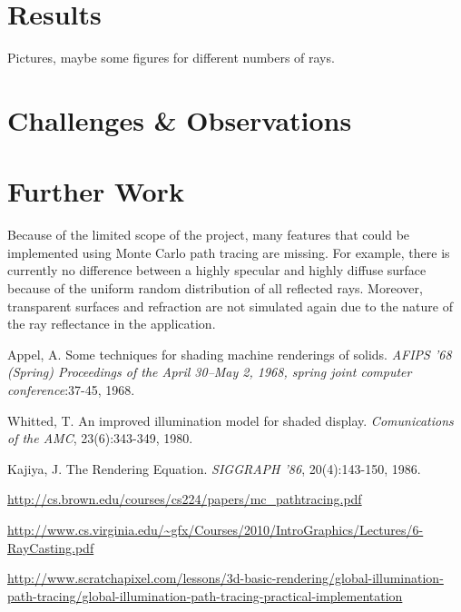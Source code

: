 \documentclass[journal]{IEEEtran}
\begin{document}
\section{Results}
Pictures, maybe some figures for different numbers of rays.

\section{Challenges \& Observations}

\section{Further Work}
Because of the limited scope of the project, many features that could be implemented using Monte Carlo path tracing are missing. For example, there is currently no difference between a highly specular and highly diffuse surface because of the uniform random distribution of all reflected rays. Moreover, transparent surfaces and refraction are not simulated again due to the nature of the ray reflectance in the application.


\begin{thebibliography}{5}

Appel, A. Some techniques for shading machine renderings of solids. \emph{AFIPS '68 (Spring) Proceedings of the April 30--May 2, 1968, spring joint computer conference}:37-45, 1968.

Whitted, T. An improved illumination model for shaded display. \emph{Comunications of the AMC}, 23(6):343-349, 1980.

Kajiya, J. The Rendering Equation. \emph{SIGGRAPH '86}, 20(4):143-150, 1986.

\url{http://cs.brown.edu/courses/cs224/papers/mc_pathtracing.pdf}

\url{http://www.cs.virginia.edu/~gfx/Courses/2010/IntroGraphics/Lectures/6-RayCasting.pdf}

\url{http://www.scratchapixel.com/lessons/3d-basic-rendering/global-illumination-path-tracing/global-illumination-path-tracing-practical-implementation}

\end{thebibliography}

\end{document}
